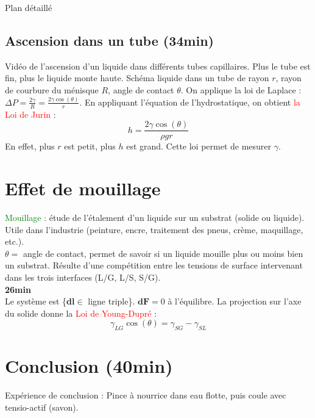 \begin{reportBlock}{Plan détaillé}
  \subsection{Ascension dans un tube (34min)}
  Vidéo de l'ascension d'un liquide dans différents tubes capillaires. Plus le tube est fin, plus le liquide monte haute.
  Schéma liquide dans un tube de rayon $r$, rayon de courbure du ménisque $R$, angle de contact $\theta$. On applique la loi de Laplace : $\Delta P = \frac{2\gamma}{R}=\frac{2\gamma\cos(\theta)}{r}$. En appliquant l'équation de l'hydrostatique, on obtient \textcolor{red}{la Loi de Jurin} :
  \begin{equation}
      h = \frac{2\gamma\cos(\theta)}{\rho g r}
  \end{equation}
  En effet, plus $r$ est petit, plus $h$ est grand. Cette loi permet de mesurer $\gamma$.

\section{Effet de mouillage}
  \textcolor{green}{Mouillage :} étude de l'étalement d'un liquide sur un substrat (solide ou liquide). Utile dans l'industrie (peinture, encre, traitement des pneus, crème, maquillage, etc.).\\
  $\theta =$ angle de contact, permet de savoir si un liquide mouille plus ou moins bien un substrat. Résulte d'une compétition entre les tensions de surface intervenant dans les trois interfaces (L/G, L/S, S/G). \\
  \textbf{26min}\\
  Le système est \{\textbf{dl}$\in$ ligne triple\}. 
  $\textbf{dF}=0$ à l'équilibre. La projection sur l'axe du solide donne la \textcolor{red}{Loi de Young-Dupré} :
  \begin{equation}
      \gamma_{LG}\cos(\theta) = \gamma_{SG}-\gamma_{SL}
  \end{equation}
  
  \section*{Conclusion (40min)}
  Expérience de conclusion : Pince à nourrice dans eau flotte, puis coule avec tensio-actif (savon).



\end{reportBlock}


